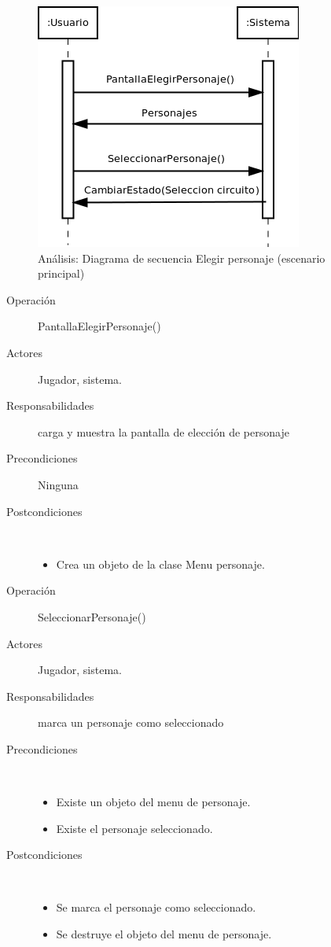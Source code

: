 \begin{figure}[H] 
  \label{secuencia_elegir_personaje}
  \begin{center}
    \includegraphics[scale=0.6]{imagenes/analisis/secuencia_elegir_personaje1.png}
  \end{center}
  \caption{Análisis: Diagrama de secuencia Elegir personaje (escenario principal)}
\end{figure}

\begin{description}
    \item [Operación] PantallaElegirPersonaje()
    \item [Actores] Jugador, sistema.
    \item [Responsabilidades] carga y muestra la pantalla de elección de personaje
    \item [Precondiciones] Ninguna
    \item [Postcondiciones] $\quad$
        \begin{itemize}
            \item Crea un objeto de la clase Menu personaje.
        \end{itemize}
\end{description}

\begin{description}
    \item [Operación] SeleccionarPersonaje()
    \item [Actores] Jugador, sistema.
    \item [Responsabilidades] marca un personaje como seleccionado
    \item [Precondiciones] $\quad$
        \begin{itemize}
            \item Existe un objeto del menu de personaje.
            \item Existe el personaje seleccionado.
        \end{itemize}
    \item [Postcondiciones] $\quad$
        \begin{itemize}
            \item Se marca el personaje como seleccionado.
            \item Se destruye el objeto del menu de personaje.
        \end{itemize}
\end{description}

